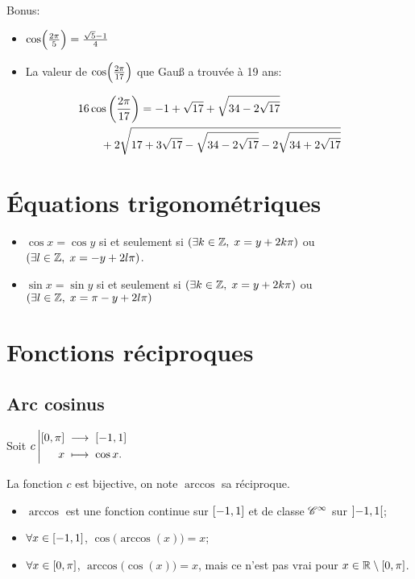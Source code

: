 \documentclass{yann}
\begin{document}
Bonus:

\begin{itemize}
\item
$\cos\Bigl({\frac{2\pi}{5}}\Bigr) = \frac{\sqrt5-1}{4}$
\item
La valeur de $\cos\Bigl({\frac{2\pi}{17}}\Bigr)$ que Gauß a trouvée à 19 ans:
\end{itemize}
\[ \begin{aligned}
      & 16\cos\left({\frac{2\pi}{17}}\right) = -1 +\sqrt{17} +\sqrt{34-2\sqrt{17}} \\
      & \qquad + 2\sqrt{17 + 3\sqrt{17} -\sqrt{34-2\sqrt{17}} - 2\sqrt{34+2\sqrt{17}}}
            \end{aligned} \]

\section{Équations trigonométriques}

\begin{itemize}
\item
$\cos x = \cos y$
si et seulement si $(\exists k\in\mathbb{Z},\; x = y + 2k\pi)$ ou $(\exists l\in\mathbb{Z},\; x = -y + 2l\pi)$.
\item
$\sin x = \sin y$
si et seulement si $(\exists k\in\mathbb{Z},\; x = y + 2k\pi)$ ou $(\exists l\in\mathbb{Z},\; x =\pi-y + 2l\pi)$
\end{itemize}

\section{Fonctions réciproques}

\subsection{Arc cosinus}

Soit ${c}\left|\begin{aligned}{\mathopen[0,\pi\mathclose]}&\;\longrightarrow\;{\mathopen[-1,1\mathclose]}\\{x}&\;\longmapsto\;{\cos x.}\end{aligned}\right.$

La fonction $c$ est bijective, on note $\arccos$ sa réciproque.

\begin{itemize}
\item
$\arccos$ est une fonction continue sur $\mathopen[-1,1\mathclose]$
et de classe $\mathscr{C}^{\infty}$ sur $\mathopen]-1,1\mathclose[$;
\item
$\forall x\in\mathopen[-1,1\mathclose]$, $\cos\bigl(\arccos(x)\bigr) = x$;
\item
$\forall x\in\mathopen[0,\pi\mathclose]$, $\arccos\bigl(\cos(x)\bigr) = x$,
mais ce n'est pas vrai pour $x\in\mathbb{R}\setminus\mathopen[0,\pi\mathclose]$.
\end{itemize}
\end{document}
